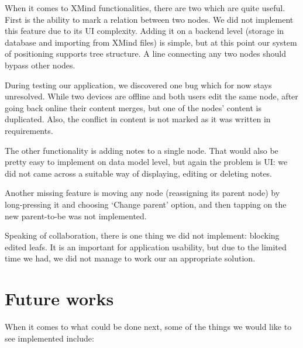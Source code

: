 When it comes to XMind functionalities, there are two which are quite useful. First is the ability to mark a relation between two nodes. We did not implement this feature due to its UI complexity. Adding it on a backend level (storage in database and importing from XMind files) is simple, but at this point our system of positioning supports tree structure. A line connecting any two nodes should  bypass other nodes. 

During testing our application, we discovered one bug which for now stays unresolved. While two devices are offline and both users edit the same node, after going back online their content merges, but one of the nodes' content is duplicated. Also, the conflict in content is not marked as it was written in requirements.

The other functionality is adding notes to a single node. That would also be pretty easy to implement on data model level, but again the problem is UI: we did not came across a suitable way of displaying, editing or deleting notes.
 
 Another missing feature is moving any node (reassigning its parent node) by long-pressing it and choosing `Change parent' option, and then tapping on the new parent-to-be was not implemented. 

Speaking of collaboration, there is one thing we did not implement: blocking edited leafs. It is an important for application usability, but due to the limited time we had, we did not manage to work our an appropriate solution. 

\section{Future works}
\label{sec:summary-future}
When it comes to what could be done next, some of the things we would like to see implemented include:

